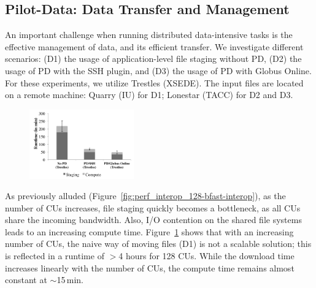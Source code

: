 \documentclass[conference]{IEEEtran}
\begin{document}
\subsection{Pilot-Data: Data Transfer and Management}
\label{sec:experiment-pilotdata}
An important challenge
when running distributed data-intensive tasks is the effective
management of data, and its efficient transfer. We investigate
different scenarios: (D1) the usage of application-level file staging
without PD, (D2) the usage of PD with the SSH plugin, %
and (D3) the usage of PD with Globus
Online. For these experiments, we utilize Trestles (XSEDE). The input
files are located on a remote machine: Quarry (IU) for D1; Lonestar
(TACC) for D2 and D3.


\begin{figure}[t]
	\upp
	\centering
		\includegraphics[width=0.4\textwidth]{../perf/sc/pd-128cus.pdf}
	\caption{}
	\label{fig:perf_sc_download-concurrent-cus}
\end{figure}


As previously alluded
(Figure~\ref{fig:perf_interop_128-bfast-interop}), as the number of
CUs increases, file staging quickly becomes a bottleneck, as all CUs
share the incoming bandwidth.  Also, I/O contention on the shared file
systems leads to an increasing compute time.
Figure~\ref{fig:perf_sc_download-concurrent-cus} shows that with an
increasing number of CUs, the naive way of moving files (D1) is not a
scalable solution; this is reflected in a runtime of $>$4 hours for 128
CUs.  While the download time increases linearly with the number of
CUs, the compute time remains almost constant at $\sim$15\,min.
\end{document}
